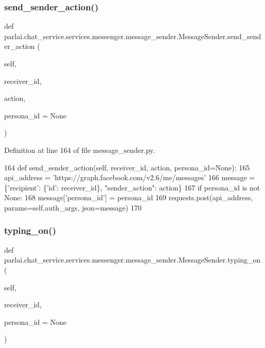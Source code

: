 \subsubsection{\texorpdfstring{send\+\_\+sender\+\_\+action()}{send\_sender\_action()}}
{\footnotesize\ttfamily def parlai.\+chat\+\_\+service.\+services.\+messenger.\+message\+\_\+sender.\+Message\+Sender.\+send\+\_\+sender\+\_\+action (\begin{DoxyParamCaption}\item[{}]{self,  }\item[{}]{receiver\+\_\+id,  }\item[{}]{action,  }\item[{}]{persona\+\_\+id = {\ttfamily None} }\end{DoxyParamCaption})}



Definition at line 164 of file message\+\_\+sender.\+py.


\begin{DoxyCode}
164     \textcolor{keyword}{def }send\_sender\_action(self, receiver\_id, action, persona\_id=None):
165         api\_address = \textcolor{stringliteral}{'https://graph.facebook.com/v2.6/me/messages'}
166         message = \{\textcolor{stringliteral}{'recipient'}: \{\textcolor{stringliteral}{'id'}: receiver\_id\}, \textcolor{stringliteral}{"sender\_action"}: action\}
167         \textcolor{keywordflow}{if} persona\_id \textcolor{keywordflow}{is} \textcolor{keywordflow}{not} \textcolor{keywordtype}{None}:
168             message[\textcolor{stringliteral}{'persona\_id'}] = persona\_id
169         requests.post(api\_address, params=self.auth\_args, json=message)
170 
\end{DoxyCode}
\mbox{\label{classparlai_1_1chat__service_1_1services_1_1messenger_1_1message__sender_1_1MessageSender_ade12174a453cd019fefc4aed2f811fd5}} 
\subsubsection{\texorpdfstring{typing\+\_\+on()}{typing\_on()}}
{\footnotesize\ttfamily def parlai.\+chat\+\_\+service.\+services.\+messenger.\+message\+\_\+sender.\+Message\+Sender.\+typing\+\_\+on (\begin{DoxyParamCaption}\item[{}]{self,  }\item[{}]{receiver\+\_\+id,  }\item[{}]{persona\+\_\+id = {\ttfamily None} }\end{DoxyParamCaption})}



